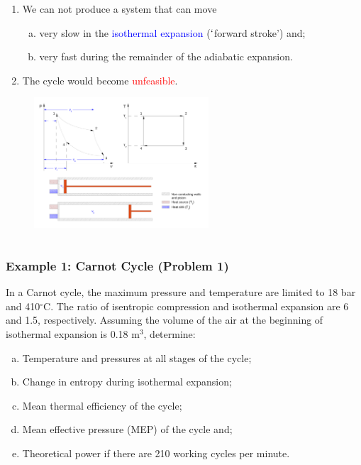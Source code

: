 \documentclass[10pt,compress]{beamer}
\newcommand{\red}{\textcolor{red}}
\newcommand{\blue}{\textcolor{blue}}
\begin{document}
\begin{frame}
\begin{columns}
\begin{column}[c]{0.55\linewidth}
\begin{enumerate}[(1)]
     \item<4-> We can not produce a system that can move
     \begin{enumerate}[(a)] \scriptsize
        \item<4-> very slow in the \blue{isothermal expansion} ($\lq$forward stroke') and;
        \item<4-> very fast during the remainder of the adiabatic expansion. 
     \end{enumerate}
     \item<5-> The cycle would become \red{unfeasible}.
   \end{enumerate} 
   \begin{figure}%
    \begin{center}
     \includegraphics[width=6.5cm,clip]{./Pics/Carnot_Reciprocating}
    \end{center}
   \end{figure} 
  \end{column}  
 \end{columns} 
\end{frame}

\begin{frame}
 \frametitle{Example 1: Carnot Cycle (Problem 1)}
     In a Carnot cycle, the maximum pressure and temperature are limited to 18 bar and 410$^{\circ}$C. The ratio of isentropic compression and isothermal expansion are 6 and 1.5, respectively. Assuming the volume of the air at the beginning of isothermal expansion is 0.18 m$^{3}$, determine:
       \begin{enumerate}[(a)]
          \item Temperature and pressures at all stages of the cycle; 
          \item Change in entropy during isothermal expansion; 
          \item Mean thermal efficiency of the cycle; 
          \item Mean effective pressure (MEP) of the cycle and;
          \item Theoretical power if there are 210 working cycles per minute.
       \end{enumerate}
\end{frame}
\end{document}
